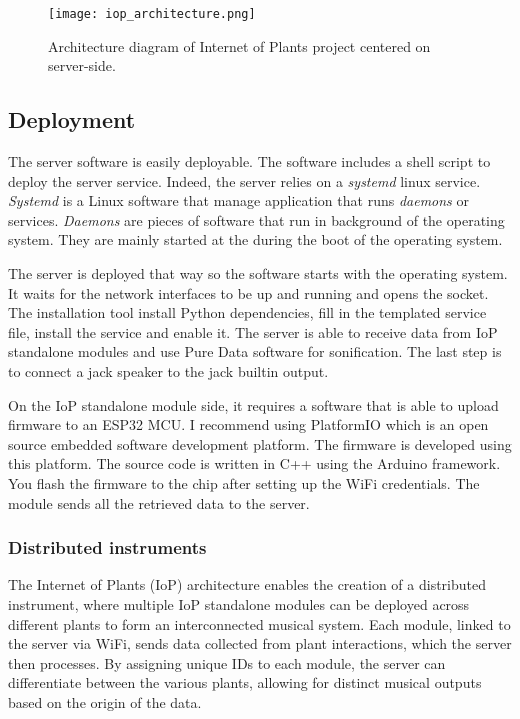 \begin{figure}[h]
    \centering
    \texttt{[image: iop\_architecture.png]}
    \caption{Architecture diagram of Internet of Plants project centered on server-side.} 
    \vspace{0.1cm}
    \label{fig:server_architecture}
\end{figure}


\subsection{Deployment} %

The server software is easily deployable. The software includes a shell script to deploy the server service.
Indeed, the server relies on a \textit{systemd} linux service. \textit{Systemd} \cite{Both2020} is a
Linux software that manage application that runs \textit{daemons} or services.
\textit{Daemons} are pieces of software that run in background of the operating
system. They are mainly started at the during the boot of the operating system.

The server is deployed that way so the software starts with the operating system.
It waits for the network interfaces to be up and running and opens the socket.
The installation tool install Python dependencies, fill in the templated service file,
install the service and enable it. The server is able to receive data from IoP standalone
modules and use Pure Data software for sonification. The last step is to connect
a jack speaker to the jack builtin output.

On the IoP standalone module side, it requires a software that is able to upload 
firmware to an ESP32 MCU. I recommend using PlatformIO which is an open source 
embedded software development platform. The firmware is developed using this platform.
The source code is written in C++ using the Arduino framework. You flash the firmware
to the chip after setting up the WiFi credentials.
The module sends all the retrieved data to the server.

\subsubsection{Distributed instruments}

The Internet of Plants (IoP) architecture enables the creation of a distributed instrument, where multiple IoP standalone modules can be deployed across different plants to form an interconnected musical system. Each module, linked to the server via WiFi, sends data collected from plant interactions, which the server then processes. By assigning unique IDs to each module, the server can differentiate between the various plants, allowing for distinct musical outputs based on the origin of the data.

